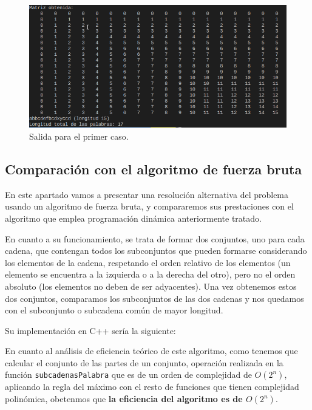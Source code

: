 \begin{figure}
  \centering
  \includegraphics[scale=0.67]{img/LettersMatrixResult.png}
  \caption{Salida para el primer caso.}
  \label{fig:1}
\end{figure}

\subsection{Comparación con el algoritmo de fuerza bruta}

En este apartado vamos a presentar una resolución alternativa del problema
usando un algoritmo de fuerza bruta, y compararemos sus prestaciones con el
algoritmo que emplea programación dinámica anteriormente tratado.

En cuanto a su funcionamiento, se trata de formar dos conjuntos, uno para cada cadena, que contengan todos los subconjuntos que pueden formarse considerando los elementos de la cadena, respetando el orden relativo de los elementos (un elemento se encuentra a la izquierda o a la derecha del otro), pero no el orden absoluto (los elementos no deben de ser adyacentes). Una vez obtenemos estos dos conjuntos, comparamos los subconjuntos de las dos cadenas y nos quedamos con el subconjunto 
o subcadena común de mayor longitud.

Su implementación en C++ sería la siguiente:



En cuanto al análisis de eficiencia teórico de este algoritmo, como tenemos que calcular el conjunto de las partes de un conjunto, operación realizada en la función 
\texttt{subcadenasPalabra} que es de un orden de complejidad de $O(2^{n})$, aplicando la regla del máximo con el resto de funciones que tienen complejidad polinómica, obetenmos que \textbf{la eficiencia del algoritmo es de $O(2^{n})$}.

